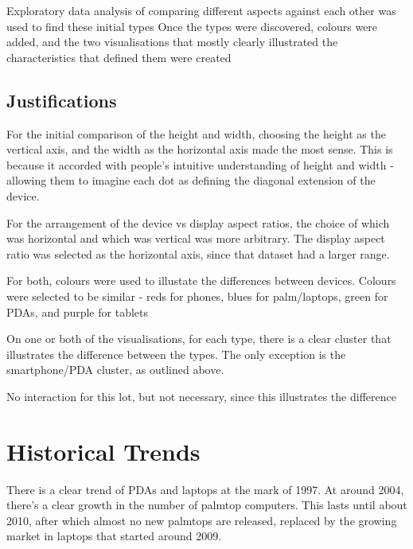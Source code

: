 \documentclass[conference]{IEEEtran}
\begin{document}
Exploratory data analysis of comparing different aspects against each other was used to find these initial types
Once the types were discovered, colours were added, and the two visualisations that mostly clearly illustrated the characteristics that defined them were created

\subsection{Justifications}

For the initial comparison of the height and width, choosing the height as the vertical axis, and the width as the horizontal axis made the most sense. This is because it accorded with people's intuitive understanding of height and width - allowing them to imagine each dot as defining the diagonal extension of the device.

For the arrangement of the device vs display aspect ratios, the choice of which was horizontal and which was vertical was more arbitrary. The display aspect ratio was selected as the horizontal axis, since that dataset had a larger range. 

For both, colours were used to illustate the differences between devices. Colours were selected to be similar - reds for phones, blues for palm/laptops, green for PDAs, and purple for tablets

On one or both of the visualisations, for each type, there is a clear cluster that illustrates the difference between the types. The only exception is the smartphone/PDA cluster, as outlined above.

No interaction for this lot, but not necessary, since this illustrates the difference

\section{Historical Trends}

There is a clear trend of PDAs and laptops at the mark of 1997. At around 2004, there's a clear growth in the number of palmtop computers. This lasts until about 2010, after which almost no new palmtops are released, replaced by the growing market in laptops that started around 2009.
\end{document}
